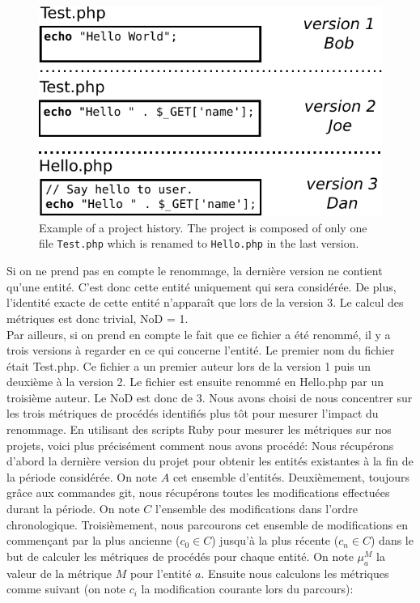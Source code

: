 \begin{figure}[t]
	\centering
	\includegraphics[width=0.8\linewidth,keepaspectratio]{data/figures/example.pdf}
	\caption{Example of a project history. The project is composed of only one file \texttt{Test.php} which is renamed to \texttt{Hello.php} in the last version.}
	\label{fig:example}
\end{figure}
Si on ne prend pas en compte le renommage, la dernière version ne contient qu'une entité. C'est donc cette entité uniquement qui sera considérée. De plus, l'identité exacte de cette entité n'apparaît que lors de la version 3. Le calcul des métriques est donc trivial, NoD = 1.\\
Par ailleurs, si on prend en compte le fait que ce fichier a été renommé, il y a trois versions à regarder en ce qui concerne l'entité. Le premier nom du fichier était Test.php. Ce fichier a un premier auteur lors de la version 1 puis un deuxième à la version 2. Le fichier est ensuite renommé en Hello.php par un troisième auteur. Le NoD est donc de 3. Nous avons choisi de nous concentrer sur les trois métriques de procédés identifiés plus tôt pour mesurer l'impact du renommage. En utilisant des scripts Ruby pour mesurer les métriques sur nos projets, voici plus précisément comment nous avons procédé: Nous récupérons d'abord la dernière version du projet pour obtenir les entités existantes à la fin de la période considérée. On note $A$ cet ensemble d'entités. Deuxièmement, toujours grâce aux commandes git, nous récupérons toutes les modifications effectuées durant la période. On note $C$ l'ensemble des modifications dans l'ordre chronologique. Troisièmement, nous parcourons cet ensemble de modifications en commençant par la plus ancienne ($c_0 \in C$) jusqu'à la plus récente ($c_n \in C$) dans le but de calculer les métriques de procédés pour chaque entité. On note $\mu_{a}^{M}$ la valeur de la métrique $M$ pour l'entité $a$. Ensuite nous calculons les métriques comme suivant (on note $c_i$ la modification courante lors du parcours):

